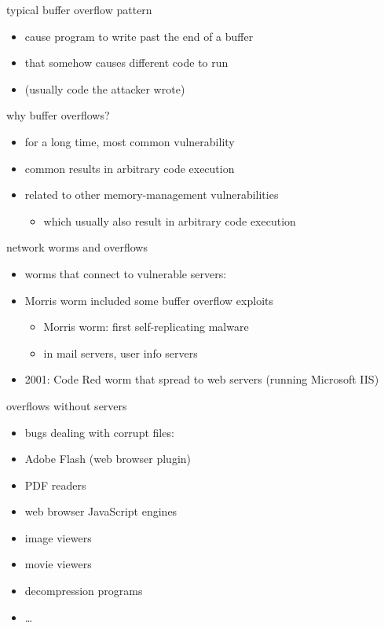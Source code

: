 
\begin{frame}{typical buffer overflow pattern}
    \begin{itemize}
    \item cause program to write past the end of a buffer
    \item that somehow causes different code to run
    \item (usually code the attacker wrote)
    \end{itemize}
\end{frame}

\begin{frame}{why buffer overflows?}
    \begin{itemize}
    \item for a long time, most common vulnerability
    \item common results in arbitrary code execution
    \vspace{.5cm}
    \item related to other memory-management vulnerabilities
        \begin{itemize}
        \item which usually also result in arbitrary code execution
        \end{itemize}
    \end{itemize}
\end{frame}

\begin{frame}{network worms and overflows}
    \begin{itemize}
    \item worms that connect to vulnerable servers:
    \vspace{.5cm}
    \item Morris worm included some buffer overflow exploits
        \begin{itemize}
        \item Morris worm: first self-replicating malware
        \item in mail servers, user info servers
        \end{itemize}
    \item 2001: Code Red worm that spread to web servers (running Microsoft IIS)
    \end{itemize}
\end{frame}

\begin{frame}{overflows without servers}
    \begin{itemize}
    \item bugs dealing with corrupt files:
    \vspace{.5cm}
    \item Adobe Flash (web browser plugin)
    \item PDF readers
    \item web browser JavaScript engines
    \item image viewers
    \item movie viewers 
    \item decompression programs
    \item \ldots
    \end{itemize}
\end{frame}


